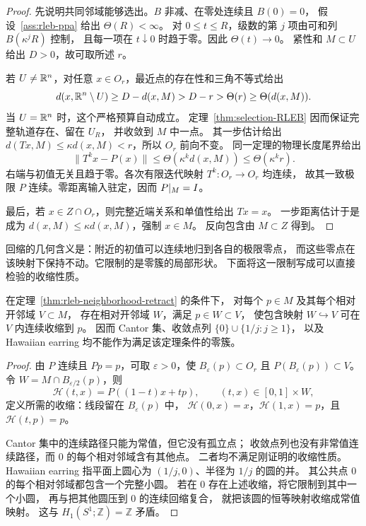 \begin{proof}
先说明共同邻域能够选出。$B$ 非减、在零处连续且 $B(0)=0$，
假设~\ref{ass:rleb-ppa} 给出 $\Theta(R)<\infty$。
对 $0\le t\le R$，级数的第 $j$ 项由可和列 $B(\kappa^jR)$ 控制，
且每一项在 $t\downarrow0$ 时趋于零。因此 $\Theta(t)\to0$。
紧性和 $M\subset U$ 给出 $D>0$，故可取所述 $r$。

若 $U\ne\mathbb R^n$，对任意 $x\in O_r$，最近点的存在性和三角不等式给出
\[
 d(x,\mathbb R^n\setminus U)
 \ge D-d(x,M)>D-r>\Theta(r)\ge\Theta(d(x,M)).
\]
当 $U=\mathbb R^n$ 时，这个严格预算自动成立。
定理~\ref{thm:selection-RLEB} 因而保证完整轨道存在、留在 $U_R$，
并收敛到 $M$ 中一点。
其一步估计给出
$d(Tx,M)\le\kappa d(x,M)<r$，所以 $O_r$ 前向不变。
同一定理的物理长度尾界给出
\[
 \|T^kx-P(x)\|
 \le\Theta(\kappa^kd(x,M))\le\Theta(\kappa^kr).
\]
右端与初值无关且趋于零。各次有限迭代映射 $T^k:O_r\to O_r$ 均连续，
故其一致极限 $P$ 连续。零距离输入驻定，因而 $P|_M=I$。

最后，若 $x\in Z\cap O_r$，则完整近端关系和单值性给出 $Tx=x$。
一步距离估计于是成为 $d(x,M)\le\kappa d(x,M)$，强制 $x\in M$。
反向包含由 $M\subset Z$ 得到。
\end{proof}

回缩的几何含义是：附近的初值可以连续地归到各自的极限零点，
而这些零点在该映射下保持不动。它限制的是零簇的局部形状。
下面将这一限制写成可以直接检验的收缩性质。

\begin{corollary}[零簇的局部可缩性]
\label{cor:rleb-local-contractibility}
在定理~\ref{thm:rleb-neighborhood-retract} 的条件下，
对每个 $p\in M$ 及其每个相对开邻域 $V\subset M$，
存在相对开邻域 $W$，满足 $p\in W\subset V$，
使包含映射 $W\hookrightarrow V$ 可在 $V$ 内连续收缩到 $p$。
因而 Cantor 集、收敛点列 $\{0\}\cup\{1/j:j\ge1\}$，
以及 Hawaiian earring 均不能作为满足该定理条件的零簇。
\end{corollary}

\begin{proof}
由 $P$ 连续且 $Pp=p$，可取 $\varepsilon>0$，使
$B_\varepsilon(p)\subset O_r$ 且 $P(B_\varepsilon(p))\subset V$。
令 $W=M\cap B_{\varepsilon/2}(p)$，则
\[
 \mathcal H(t,x)=P((1-t)x+tp),
 \qquad (t,x)\in[0,1]\times W,
\]
定义所需的收缩：线段留在 $B_\varepsilon(p)$ 中，
$\mathcal H(0,x)=x$，$\mathcal H(1,x)=p$，且 $\mathcal H(t,p)=p$。

Cantor 集中的连续路径只能为常值，但它没有孤立点；
收敛点列也没有非常值连续路径，而 $0$ 的每个相对邻域含有其他点。
二者均不满足刚证明的收缩性质。
Hawaiian earring 指平面上圆心为 $(1/j,0)$、半径为 $1/j$ 的圆的并。
其公共点 $0$ 的每个相对邻域都包含一个完整小圆。
若在 $0$ 存在上述收缩，将它限制到其中一个小圆，
再与把其他圆压到 $0$ 的连续回缩复合，
就把该圆的恒等映射收缩成常值映射。
这与 $H_1(S^1;\mathbb Z)=\mathbb Z$ 矛盾。
\end{proof}


